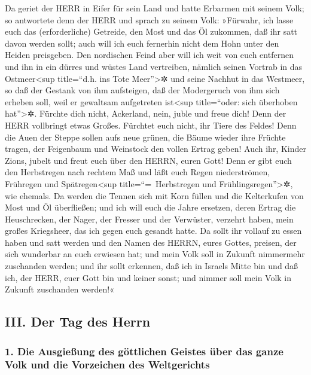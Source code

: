 Da geriet der HERR in Eifer für sein Land und hatte
Erbarmen mit seinem Volk; so antwortete denn der HERR und
sprach zu seinem Volk: »Fürwahr, ich lasse euch das (erforderliche)
Getreide, den Most und das Öl zukommen, daß ihr satt davon werden sollt;
auch will ich euch fernerhin nicht dem Hohn unter den Heiden preisgeben.
Den nordischen Feind aber will ich weit von euch
entfernen und ihn in ein dürres und wüstes Land vertreiben, nämlich
seinen Vortrab in das Ostmeer\textless sup title=``d.h. ins Tote
Meer''\textgreater✲ und seine Nachhut in das Westmeer, so daß der
Gestank von ihm aufsteigen, daß der Modergeruch von ihm sich erheben
soll, weil er gewaltsam aufgetreten ist\textless sup title=``oder: sich
überhoben hat''\textgreater✲. Fürchte dich nicht,
Ackerland, nein, juble und freue dich! Denn der HERR vollbringt etwas
Großes. Fürchtet euch nicht, ihr Tiere des Feldes! Denn
die Auen der Steppe sollen aufs neue grünen, die Bäume wieder ihre
Früchte tragen, der Feigenbaum und Weinstock den vollen Ertrag geben!
Auch ihr, Kinder Zions, jubelt und freut euch über den
HERRN, euren Gott! Denn er gibt euch den Herbstregen nach rechtem Maß
und läßt euch Regen niederströmen, Frühregen und Spätregen\textless sup
title=``=~Herbstregen und Frühlingsregen''\textgreater✲, wie ehemals.
Da werden die Tennen sich mit Korn füllen und die
Kelterkufen von Most und Öl überfließen; und ich will
euch die Jahre ersetzen, deren Ertrag die Heuschrecken, der Nager, der
Fresser und der Verwüster, verzehrt haben, mein großes Kriegsheer, das
ich gegen euch gesandt hatte. Da sollt ihr vollauf zu
essen haben und satt werden und den Namen des HERRN, eures Gottes,
preisen, der sich wunderbar an euch erwiesen hat; und mein Volk soll in
Zukunft nimmermehr zuschanden werden; und ihr sollt
erkennen, daß ich in Israels Mitte bin und daß ich, der HERR, euer Gott
bin und keiner sonst; und nimmer soll mein Volk in Zukunft zuschanden
werden!«

\hypertarget{iii.-der-tag-des-herrn}{%
\subsection{III. Der Tag des Herrn}\label{iii.-der-tag-des-herrn}}

\hypertarget{die-ausgieuxdfung-des-guxf6ttlichen-geistes-uxfcber-das-ganze-volk-und-die-vorzeichen-des-weltgerichts}{%
\subsubsection{1. Die Ausgießung des göttlichen Geistes über das ganze
Volk und die Vorzeichen des
Weltgerichts}\label{die-ausgieuxdfung-des-guxf6ttlichen-geistes-uxfcber-das-ganze-volk-und-die-vorzeichen-des-weltgerichts}}

